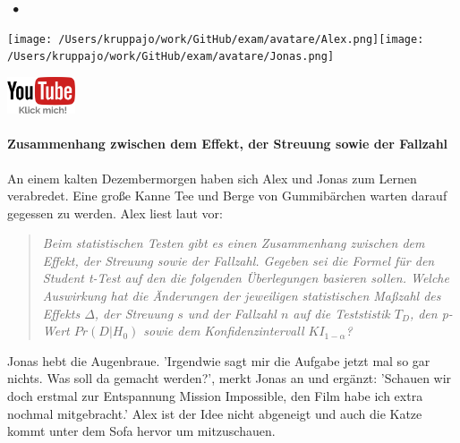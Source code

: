 \documentclass[a4paper, 9pt]{scrartcl}\usepackage[]{graphicx}\usepackage[]{xcolor}
\begin{document}
 
\ifcollection
\begin{flushright}
\tiny\vspace{-3Ex}
\textbf{\examinhaltstart}
\exammodulestatversuch $\;\bullet$
\exammodulebiostat
\vspace{-4Ex}
\end{flushright}
\begin{minipage}[t]{0.5\textwidth}
\texttt{[image: /Users/kruppajo/work/GitHub/exam/avatare/Alex.png]}\hspace{-4mm}\texttt{[image: /Users/kruppajo/work/GitHub/exam/avatare/Jonas.png]}
\end{minipage}
\begin{minipage}[t]{0.5\textwidth}
\hfill
\href{https://youtu.be/SejyJ0K20jA}{\includegraphics[width = 2cm]{img/youtube}}
\end{minipage}
\fi



\ifcollection
\paragraph{Zusammenhang zwischen dem Effekt, der Streuung sowie der Fallzahl}
\fi

An einem kalten Dezembermorgen haben sich Alex und Jonas zum Lernen verabredet. Eine große Kanne Tee und Berge von Gummibärchen warten darauf gegessen zu werden. Alex liest laut vor:\begin{quote}
                 \textit{
                 Beim statistischen Testen gibt es einen Zusammenhang zwischen dem Effekt, der Streuung sowie der Fallzahl. Gegeben sei die Formel für den Student t-Test auf den die folgenden Überlegungen basieren sollen. Welche Auswirkung hat die Änderungen der jeweiligen statistischen Maßzahl des Effekts $\Delta$, der Streuung $s$ und der Fallzahl $n$ auf die Teststistik $T_{D}$, den p-Wert $Pr(D|H_0)$ sowie dem Konfidenzintervall $KI_{1-\alpha}$?
                 }
                 \end{quote}Jonas hebt die Augenbraue. 'Irgendwie sagt mir die Aufgabe jetzt mal so gar nichts. Was soll da gemacht werden?', merkt Jonas an und ergänzt: 'Schauen wir doch erstmal zur Entspannung Mission Impossible, den Film habe ich extra nochmal mitgebracht.' Alex ist der Idee nicht abgeneigt und auch die Katze kommt unter dem Sofa hervor um mitzuschauen. 
\end{document}
